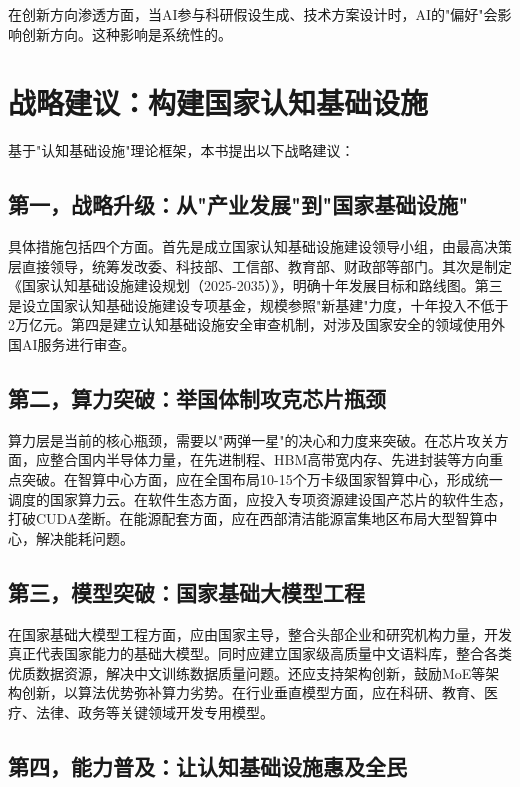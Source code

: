在创新方向渗透方面，当AI参与科研假设生成、技术方案设计时，AI的"偏好"会影响创新方向。这种影响是系统性的。

\section{战略建议：构建国家认知基础设施}

基于"认知基础设施"理论框架，本书提出以下战略建议：

\subsection{第一，战略升级：从"产业发展"到"国家基础设施"}

具体措施包括四个方面。首先是成立国家认知基础设施建设领导小组，由最高决策层直接领导，统筹发改委、科技部、工信部、教育部、财政部等部门。其次是制定《国家认知基础设施建设规划（2025-2035）》，明确十年发展目标和路线图。第三是设立国家认知基础设施建设专项基金，规模参照"新基建"力度，十年投入不低于2万亿元。第四是建立认知基础设施安全审查机制，对涉及国家安全的领域使用外国AI服务进行审查。

\subsection{第二，算力突破：举国体制攻克芯片瓶颈}

算力层是当前的核心瓶颈，需要以"两弹一星"的决心和力度来突破。在芯片攻关方面，应整合国内半导体力量，在先进制程、HBM高带宽内存、先进封装等方向重点突破。在智算中心方面，应在全国布局10-15个万卡级国家智算中心，形成统一调度的国家算力云。在软件生态方面，应投入专项资源建设国产芯片的软件生态，打破CUDA垄断。在能源配套方面，应在西部清洁能源富集地区布局大型智算中心，解决能耗问题。

\subsection{第三，模型突破：国家基础大模型工程}

在国家基础大模型工程方面，应由国家主导，整合头部企业和研究机构力量，开发真正代表国家能力的基础大模型。同时应建立国家级高质量中文语料库，整合各类优质数据资源，解决中文训练数据质量问题。还应支持架构创新，鼓励MoE等架构创新，以算法优势弥补算力劣势。在行业垂直模型方面，应在科研、教育、医疗、法律、政务等关键领域开发专用模型。

\subsection{第四，能力普及：让认知基础设施惠及全民}

